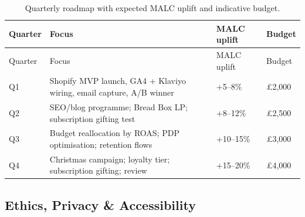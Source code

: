 \documentclass[
  11pt,
]{article}
\begin{document}
\begin{longtable}[]{@{}
  >{\raggedright\arraybackslash}p{}
  >{\raggedright\arraybackslash}p{}
  >{\raggedright\arraybackslash}p{}
  >{\raggedright\arraybackslash}p{}@{}}
\caption{Quarterly roadmap with expected MALC uplift and indicative
budget.}\tabularnewline
\toprule\noalign{}
\begin{minipage}[b]{\linewidth}\raggedright
Quarter
\end{minipage} & \begin{minipage}[b]{\linewidth}\raggedright
Focus
\end{minipage} & \begin{minipage}[b]{\linewidth}\raggedright
MALC uplift
\end{minipage} & \begin{minipage}[b]{\linewidth}\raggedright
Budget
\end{minipage} \\
\midrule\noalign{}
\endfirsthead
\toprule\noalign{}
\begin{minipage}[b]{\linewidth}\raggedright
Quarter
\end{minipage} & \begin{minipage}[b]{\linewidth}\raggedright
Focus
\end{minipage} & \begin{minipage}[b]{\linewidth}\raggedright
MALC uplift
\end{minipage} & \begin{minipage}[b]{\linewidth}\raggedright
Budget
\end{minipage} \\
\midrule\noalign{}
\endhead
\bottomrule\noalign{}
\endlastfoot
Q1 & Shopify MVP launch, GA4 + Klaviyo wiring, email capture, A/B winner
& +5--8\% & £2,000 \\
Q2 & SEO/blog programme; Bread Box LP; subscription gifting test &
+8--12\% & £2,500 \\
Q3 & Budget reallocation by ROAS; PDP optimisation; retention flows &
+10--15\% & £3,000 \\
Q4 & Christmas campaign; loyalty tier; subscription gifting; review &
+15--20\% & £4,000 \\
\end{longtable}

\subsection{Ethics, Privacy \&
Accessibility}\label{ethics-privacy-accessibility}
\end{document}
